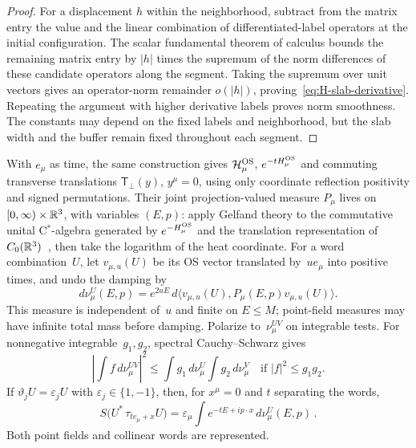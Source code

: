 \begin{proof}
For a displacement $h$ within the neighborhood, subtract from the matrix entry the value and the linear combination of differentiated-label operators at the initial configuration. The scalar fundamental theorem of calculus bounds the remaining matrix entry by $|h|$ times the supremum of the norm differences of these candidate operators along the segment. Taking the supremum over unit vectors gives an operator-norm remainder $o(|h|)$, proving~\eqref{eq:H-slab-derivative}. Repeating the argument with higher derivative labels proves norm smoothness. The constants may depend on the fixed labels and neighborhood, but the slab width and the buffer remain fixed throughout each segment.
\end{proof}

With $e_\mu$ as time, the same construction gives $\mathcal H_\mu^{\rm OS}$, $e^{-tH_\mu^{\rm OS}}$ and commuting transverse translations $\mathsf T_\perp(y)$, $y^\mu=0$, using only coordinate reflection positivity and signed permutations. Their joint projection-valued measure $P_\mu$ lives on $[0,\infty)\times\mathbb{R}^3$, with variables $(E,p)$: apply Gelfand theory to the commutative unital C$^*$-algebra generated by $e^{-H_\mu^{\rm OS}}$ and the translation representation of $C_0(\mathbb{R}^3)$~\cite[Theorems~2.4.1, 3.7.11, equation~(3.89) and Proposition~4.2.3]{Landsman1998}, then take the logarithm of the heat coordinate. For a word combination~$U$, let $v_{\mu,u}(U)$ be its OS vector translated by~$ue_\mu$ into positive times, and undo the damping by
\begin{equation}\label{eq:H-coordinate-measure}
d\nu_\mu^U(E,p)=e^{2uE}\,d\langle v_{\mu,u}(U),P_\mu(E,p)v_{\mu,u}(U)\rangle .
\end{equation}
This measure is independent of~$u$ and finite on $E\le M$; point-field measures may have infinite total mass before damping. Polarize to~$\nu_\mu^{UV}$ on integrable tests. For nonnegative integrable~$g_1,g_2$, spectral Cauchy--Schwarz gives
\begin{equation}\label{eq:H-coordinate-CS}
\left|\int f\,d\nu_\mu^{UV}\right|^2\le\int g_1\,d\nu_\mu^U\int g_2\,d\nu_\mu^V
\quad\text{if }|f|^2\le g_1g_2.
\end{equation}
If $\vartheta_jU=\varepsilon_jU$ with $\varepsilon_j\in\{1,-1\}$, then, for $x^\mu=0$ and $t$ separating the words,
\begin{equation*}
S\bigl(U^*\,\tau_{te_\mu+x}U\bigr)
=\varepsilon_\mu\int e^{-tE+ip\cdot x}\,d\nu_\mu^U(E,p)\,.
\end{equation*}
Both point fields and collinear words are represented.

